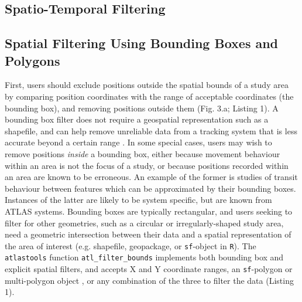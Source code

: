\begin{refsection}
    \section{Spatio-Temporal Filtering}

    \subsection{Spatial Filtering Using Bounding Boxes and Polygons}

    First, users should exclude positions outside the spatial bounds of a study area by comparing position coordinates with the range of acceptable coordinates (the bounding box), and removing positions outside them (Fig. 3.a; Listing 1). 
    A bounding box filter does not require a geospatial representation such as a shapefile, and can help remove unreliable data from a tracking system that is less accurate beyond a certain range \citep[][]{beardsworth2021}.
    In some special cases, users may wish to remove positions \textit{inside} a bounding box, either because movement behaviour within an area is not the focus of a study, or because positions recorded within an area are known to be erroneous.
    An example of the former is studies of transit behaviour between features which can be approximated by their bounding boxes. 
    Instances of the latter are likely to be system specific, but are known from ATLAS systems. 
    Bounding boxes are typically rectangular, and users seeking to filter for other geometries, such as a circular or irregularly-shaped study area, need a geometric intersection between their data and a spatial representation of the area of interest (e.g. shapefile, geopackage, or \texttt{sf}-object in \texttt{R}).
    The \texttt{atlastools} function \texttt{atl\_filter\_bounds} implements both bounding box and explicit spatial filters, and accepts X and Y coordinate ranges, an \texttt{sf}-polygon or multi-polygon object \citep{pebesma2018}, or any combination of the three to filter the data (Listing 1).


\end{refsection}
